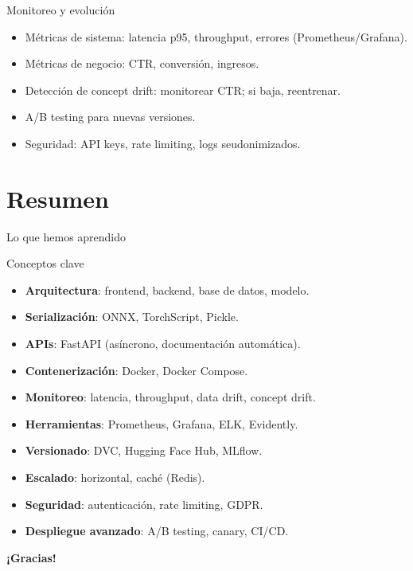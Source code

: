 \documentclass[aspectratio=169, 10pt, xcolor=table]{beamer}
\begin{document}
\begin{frame}{Monitoreo y evolución}
    \begin{itemize}
        \item Métricas de sistema: latencia p95, throughput, errores (Prometheus/Grafana).
        \item Métricas de negocio: CTR, conversión, ingresos.
        \item Detección de concept drift: monitorear CTR; si baja, reentrenar.
        \item A/B testing para nuevas versiones.
        \item Seguridad: API keys, rate limiting, logs seudonimizados.
    \end{itemize}
\end{frame}

\section{Resumen}

\begin{frame}{Lo que hemos aprendido}
    \begin{exampleblock}{Conceptos clave}
        \begin{itemize}
            \item \textbf{Arquitectura}: frontend, backend, base de datos, modelo.
            \item \textbf{Serialización}: ONNX, TorchScript, Pickle.
            \item \textbf{APIs}: FastAPI (asíncrono, documentación automática).
            \item \textbf{Contenerización}: Docker, Docker Compose.
            \item \textbf{Monitoreo}: latencia, throughput, data drift, concept drift.
            \item \textbf{Herramientas}: Prometheus, Grafana, ELK, Evidently.
            \item \textbf{Versionado}: DVC, Hugging Face Hub, MLflow.
            \item \textbf{Escalado}: horizontal, caché (Redis).
            \item \textbf{Seguridad}: autenticación, rate limiting, GDPR.
            \item \textbf{Despliegue avanzado}: A/B testing, canary, CI/CD.
        \end{itemize}
    \end{exampleblock}
\end{frame}

\begin{frame}
    \centering
    \Huge \textbf{¡Gracias!}

\end{frame}
\end{document}
